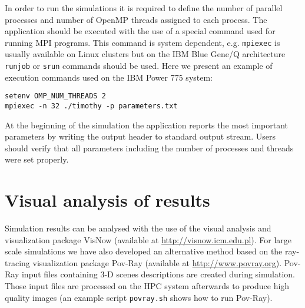 \documentclass[10pt]{article}
\newenvironment{code}%
   {\snugshade\verbatim}%
   {\endverbatim\endsnugshade}
\begin{document}
\indent In order to run the simulations it is required to define the number of parallel processes and number of OpenMP threads assigned to each process. The application should be executed with the use of a special command used for running MPI programs. This command is system dependent, e.g. {\tt mpiexec} is usually available on Linux clusters but on the IBM Blue Gene/Q architecture {\tt runjob} or {\tt srun} commands should be used. Here we present an example of execution commands used on the IBM Power 775 system:
\begin{verbatim}
setenv OMP_NUM_THREADS 2
mpiexec -n 32 ./timothy -p parameters.txt
\end{verbatim}

\indent At the beginning of the simulation the application reports the most important parameters by writing the output header to standard output stream. Users should verify that all parameters including the number of processes and threads were set properly. %



\section{Visual analysis of results}
Simulation results can be analysed with the use of the visual analysis and visualization package VisNow (available at \url{http://visnow.icm.edu.pl}). For large scale simulations we have also developed an alternative method based on the ray-tracing visualization package Pov-Ray (available at \url{http://www.povray.org}). Pov-Ray input files containing 3-D scenes descriptions are created during simulation. Those input files are processed on the HPC system afterwards to produce high quality images (an example script {\tt povray.sh} shows how to run Pov-Ray). 
\end{document}
